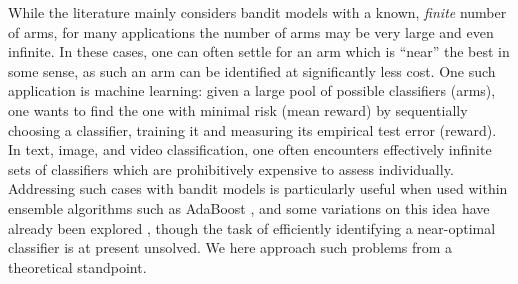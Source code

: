 While the literature mainly considers bandit models with a known,
\emph{finite} number of arms, for many applications the number of arms may
be very large and even infinite.
In these cases, one can often settle for an arm which is
``near'' the best in some sense, as such an arm can be identified at
significantly less cost.
One such application is machine learning: given a large pool of
possible classifiers (arms),
one wants to find the one with minimal risk (mean reward) by sequentially
choosing a classifier, training it
and measuring its empirical test
error (reward).
In text, image, and video classification, one often encounters effectively
infinite sets of classifiers which are prohibitively expensive to
assess individually.
Addressing such cases with bandit models
is particularly useful when used within ensemble algorithms such as
AdaBoost
\citep{Freund:1996:ENB:3091696.3091715}, and some variations on this idea have already
been explored
\citep{icml2013_appel13, busafekete:in2p3-00614564,
Dubout:2014:ASL:2627435.2638580, Escudero:2001:ULW:2387364.2387381}, though the
task of efficiently identifying a near-optimal classifier is at present
unsolved.
We here approach such problems from a theoretical standpoint.



